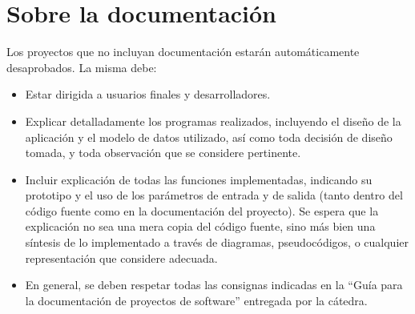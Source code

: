 \documentclass[12pt,a4paper]{article}
\begin{document}
\pagebreak

\section*{Sobre la documentación}

Los proyectos que no incluyan documentación estarán automáticamente desaprobados. La misma debe:
\begin{itemize}
	
	\item Estar dirigida a usuarios finales y desarrolladores.
	
	\item Explicar detalladamente los programas realizados, incluyendo el diseño de la aplicación y el modelo de datos utilizado, así como toda decisión de diseño tomada, y toda observación que se considere pertinente.
	
	\item Incluir explicación de todas las funciones implementadas, indicando su prototipo y el uso de los parámetros de entrada y de salida (tanto dentro del código fuente como en la documentación del proyecto). Se espera que la explicación no sea una mera copia del código fuente, sino más bien una síntesis de lo implementado a través de diagramas, pseudocódigos, o cualquier representación que considere adecuada.
	
	\item En general, se deben respetar todas las consignas indicadas en la “Guía para la documentación de proyectos de software” entregada por la cátedra.
	
\end{itemize}
\end{document}
